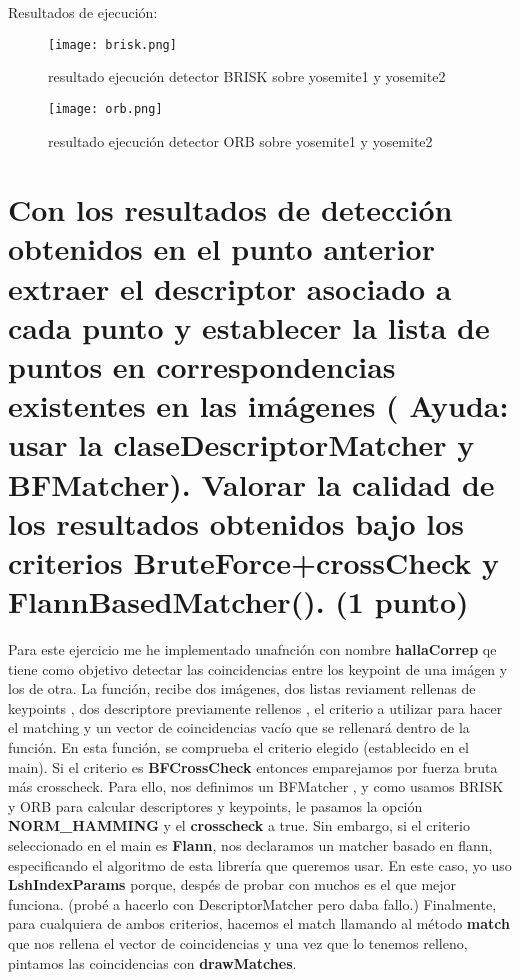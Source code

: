 
Resultados de ejecución:
\begin{figure}[H] %
\centering
\texttt{[image: brisk.png]}  %
\label{figura1}
\caption{resultado ejecución detector BRISK sobre yosemite1 y yosemite2}
\end{figure}

\begin{figure}[H] %
\centering
\texttt{[image: orb.png]}  %
\label{figura1}
\caption{resultado ejecución detector ORB sobre yosemite1 y yosemite2}
\end{figure}
\section{Con los resultados de detección obtenidos en el punto anterior extraer el
descriptor asociado a cada punto y establecer la lista de puntos en
correspondencias existentes en las imágenes ( Ayuda: usar la claseDescriptorMatcher y BFMatcher). Valorar la calidad de los resultados obtenidos
bajo los criterios BruteForce+crossCheck y FlannBasedMatcher(). (1 punto)}
Para este ejercicio me he implementado unafnción con nombre \textbf{hallaCorrep} qe tiene como objetivo detectar las coincidencias
entre los keypoint de una imágen y los de otra. La función, recibe dos imágenes, dos listas reviament rellenas de keypoints , dos descriptore
previamente rellenos , el criterio a utilizar para hacer el matching y un vector de coincidencias vacío que se rellenará
dentro de la función. \newline
En esta función, se comprueba el criterio elegido (establecido en el main). Si el criterio es \textbf{BFCrossCheck} entonces
emparejamos por fuerza bruta más crosscheck. Para ello, nos definimos un BFMatcher , y como usamos BRISK  y ORB para calcular
descriptores y keypoints, le pasamos la opción \textbf{NORM\_HAMMING} y el \textbf{crosscheck} a true. \newline
Sin embargo, si el criterio seleccionado en el main es \textbf{Flann}, nos declaramos un matcher basado en flann, especificando
el algoritmo de esta librería que queremos usar. En este caso, yo uso \textbf{LshIndexParams} porque, despés de probar con muchos
es el que mejor funciona. (probé a hacerlo con DescriptorMatcher pero daba fallo.) \newline
Finalmente, para cualquiera de ambos criterios, hacemos el match llamando al método \textbf{match} que nos rellena el vector
de coincidencias y una vez que lo tenemos relleno, pintamos las coincidencias con \textbf{drawMatches}.

